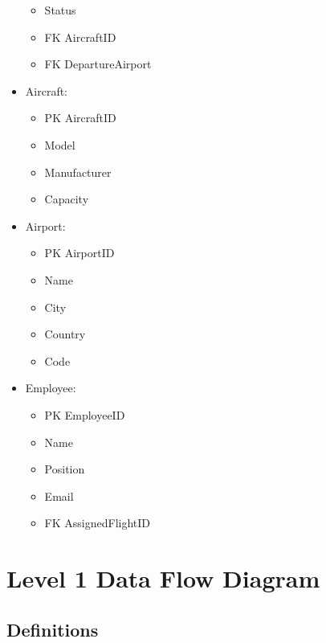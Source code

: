 \documentclass{article}
\begin{document}
\begin{itemize}
\begin{itemize}
    \item       Status
    \item FK    AircraftID
    \item FK    DepartureAirport
    \end{itemize}
\item Aircraft:
    \begin{itemize}
    \item PK    AircraftID
    \item       Model
    \item       Manufacturer
    \item       Capacity
    \end{itemize}
\item Airport:
    \begin{itemize}
    \item PK    AirportID
    \item       Name
    \item       City
    \item       Country
    \item       Code
    \end{itemize}
\item Employee:
    \begin{itemize}
    \item PK    EmployeeID
    \item       Name
    \item       Position
    \item       Email
    \item FK    AssignedFlightID
    \end{itemize}
\end{itemize}

\section{Level 1 Data Flow Diagram}

\subsection{Definitions}
\end{document}
